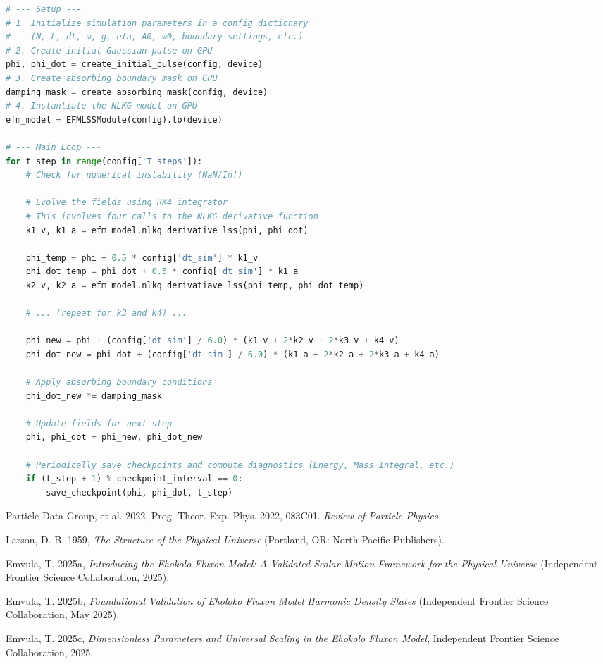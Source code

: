 \documentclass[11pt]{article}
\begin{document}
\begin{lstlisting}[language=Python, caption=Conceptual EFM Soliton Formation Logic]
# --- Setup ---
# 1. Initialize simulation parameters in a config dictionary
#    (N, L, dt, m, g, eta, A0, w0, boundary settings, etc.)
# 2. Create initial Gaussian pulse on GPU
phi, phi_dot = create_initial_pulse(config, device)
# 3. Create absorbing boundary mask on GPU
damping_mask = create_absorbing_mask(config, device)
# 4. Instantiate the NLKG model on GPU
efm_model = EFMLSSModule(config).to(device)

# --- Main Loop ---
for t_step in range(config['T_steps']):
    # Check for numerical instability (NaN/Inf)
    
    # Evolve the fields using RK4 integrator
    # This involves four calls to the NLKG derivative function
    k1_v, k1_a = efm_model.nlkg_derivative_lss(phi, phi_dot)
    
    phi_temp = phi + 0.5 * config['dt_sim'] * k1_v
    phi_dot_temp = phi_dot + 0.5 * config['dt_sim'] * k1_a
    k2_v, k2_a = efm_model.nlkg_derivatiave_lss(phi_temp, phi_dot_temp)
    
    # ... (repeat for k3 and k4) ...
    
    phi_new = phi + (config['dt_sim'] / 6.0) * (k1_v + 2*k2_v + 2*k3_v + k4_v)
    phi_dot_new = phi_dot + (config['dt_sim'] / 6.0) * (k1_a + 2*k2_a + 2*k3_a + k4_a)
    
    # Apply absorbing boundary conditions
    phi_dot_new *= damping_mask
    
    # Update fields for next step
    phi, phi_dot = phi_new, phi_dot_new
    
    # Periodically save checkpoints and compute diagnostics (Energy, Mass Integral, etc.)
    if (t_step + 1) % checkpoint_interval == 0:
        save_checkpoint(phi, phi_dot, t_step)
\end{lstlisting}


 
\begin{thebibliography}{99}
\raggedright
{}
Particle Data Group, et al. 2022, Prog. Theor. Exp. Phys. 2022, 083C01. 
\textit{Review of Particle Physics.}

Larson, D. B. 1959, \textit{The Structure of the Physical Universe} (Portland, OR: North Pacific Publishers).

Emvula, T. 2025a, \textit{Introducing the Ehokolo Fluxon Model: A Validated Scalar Motion Framework for the Physical Universe} (Independent Frontier Science Collaboration, 2025). 

Emvula, T. 2025b, \textit{Foundational Validation of Eholoko Fluxon Model Harmonic Density States} (Independent Frontier Science Collaboration, May 2025).

Emvula, T. 2025c, \textit{Dimensionless Parameters and Universal Scaling in the Ehokolo Fluxon Model}, Independent Frontier Science Collaboration, 2025.

\end{thebibliography}
\end{document}
